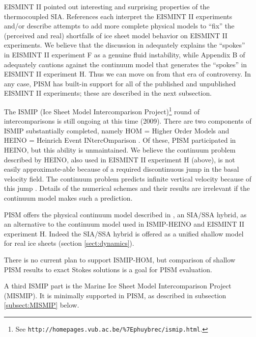 \documentclass[11pt,final]{amsart}
\begin{document}
EISMINT II \cite{EISMINT00} pointed out interesting and surprising properties of the thermocoupled SIA.  References \cite{BBL,Hindmarsh04,Hindmarsh06,PayneBaldwin,SaitoEISMINT,BBssasliding} each interpret the EISMINT II experiments and/or describe attempts to add more complete physical models to ``fix'' the (perceived and real) shortfalls of ice sheet model behavior on EISMINT II experiments.  We believe that the discussion in \cite{PayneDongelmans,PayneBaldwin,BBL} adequately explains the ``spokes'' in EISMINT II experiment F as a genuine fluid instability, while Appendix B of \cite{BBssasliding} adequately cautions against the continuum model that generates the ``spokes'' in EISMINT II experiment H.   Thus we can move on from that era of controversy.  In any case, PISM has built-in support for all of the published and unpublished EISMINT II experiments; these are described in the next subsection.

The ISMIP (Ice Sheet Model Intercomparison Project)\footnote{See \texttt{http://homepages.vub.ac.be/\%7Ephuybrec/ismip.html}.} round of intercomparisons is still ongoing at this time (2009).  There are two components of ISMIP substantially completed, namely HOM = Higher Order Models \cite{HOMtcd,HOMelmer} and HEINO = Heinrich Event INtercOmparison \cite{GreveTakahamaCalov}.  Of these, PISM participated in HEINO, but this ability is unmaintained.   We believe the continuum problem described by HEINO, also used in EISMINT II experiment H (above), is not easily approximate-able because of a required discontinuous jump in the basal velocity field.  The continuum problem predicts infinite vertical velocity because of this jump \cite[Appendix B]{BBssasliding}.  Details of the numerical schemes and their results are irrelevant if the continuum model makes such a prediction.

PISM offers the physical continuum model described in \cite{BBssasliding}, an SIA/SSA hybrid, as an alternative to the continuum model used in ISMIP-HEINO and EISMINT II experiment H.  Indeed the SIA/SSA hybrid is offered as a unified shallow model for real ice sheets (section \ref{sect:dynamics}).

There is no current plan to support ISMIP-HOM, but comparison of shallow PISM results to exact Stokes solutions is a goal for PISM evaluation.

A third ISMIP part is the Marine Ice Sheet Model Intercomparison Project (MISMIP).  It is minimally supported in PISM, as described in subsection \ref{subsect:MISMIP} below.
\end{document}
